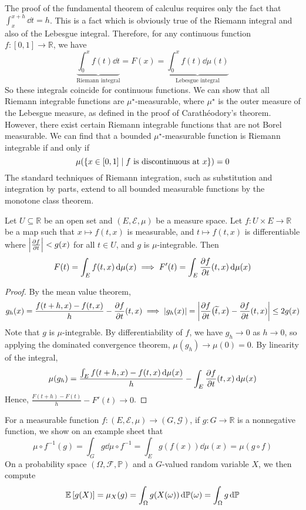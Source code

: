 \begin{remark}
	The proof of the fundamental theorem of calculus requires only the fact that \( \int_x^{x + h} \dd{t} = h \).
	This is a fact which is obviously true of the Riemann integral and also of the Lebesgue integral.
	Therefore, for any continuous function \( f \colon [0,1] \to \mathbb R \), we have
	\[ \underbrace{\int_0^x f(t) \dd{t}}_{\text{Riemann integral}} = F(x) = \underbrace{\int_0^x f(t) \dd{\mu(t)}}_{\text{Lebesgue integral}} \]
	So these integrals coincide for continuous functions.
	We can show that all Riemann integrable functions are \( \mu^\star \)-measurable, where \( \mu^\star \) is the outer measure of the Lebesgue measure, as defined in the proof of Carath\'eodory's theorem.
	However, there exist certain Riemann integrable functions that are not Borel measurable.
	We can find that a bounded \( \mu^\star \)-measurable function is Riemann integrable if and only if
	\[ \mu\qty(\qty{x \in [0,1] \mid f \text{ is discontinuous at } x}) = 0 \]
	The standard techniques of Riemann integration, such as substitution and integration by parts, extend to all bounded measurable functions by the monotone class theorem.
\end{remark}
\begin{theorem}
	Let \( U \subseteq \mathbb R \) be an open set and \( (E, \mathcal E, \mu) \) be a measure space.
	Let \( f \colon U \times E \to \mathbb R \) be a map such that \( x \mapsto f(t, x) \) is measurable, and \( t \mapsto f(t,x) \) is differentiable where \( \abs{\pdv{f}{t}} < g(x) \) for all \( t \in U \), and \( g \) is \( \mu \)-integrable.
	Then
	\[ F(t) = \int_E f(t,x) \dd{\mu(x)} \implies F'(t) = \int_E \pdv{f}{t}\qty(t,x) \dd{\mu(x)} \]
\end{theorem}
\begin{proof}
	By the mean value theorem,
	\[ g_h(x) = \frac{f(t + h, x) - f(t, x)}{h} - \pdv{f}{t}\qty(t,x) \implies \abs{g_h(x)} = \abs{\pdv{f}{t}\qty(\widetilde t, x) - \pdv{f}{t}\qty(t, x)} \leq 2g(x) \]
	Note that \( g \) is \( \mu \)-integrable.
	By differentiability of \( f \), we have \( g_h \to 0 \) as \( h \to 0 \), so applying the dominated convergence theorem, \( \mu(g_h) \to \mu(0) = 0 \).
	By linearity of the integral,
	\[ \mu(g_h) = \frac{\int_E f(t + h, x) - f(t, x) \dd{\mu(x)}}{h} - \int_E \pdv{f}{t}\qty(t,x) \dd{\mu(x)} \]
	Hence, \( \frac{F(t+h) - F(t)}{h} - F'(t) \to 0 \).
\end{proof}
\begin{example}
	For a measurable function \( f \colon (E, \mathcal E, \mu) \to (G, \mathcal G) \), if \( g \colon G \to \mathbb R \) is a nonnegative function, we show on an example sheet that
	\[ \mu \circ f^{-1}(g) = \int_G g \dd{\mu\circ f^{-1}} = \int_E g(f(x)) \dd{\mu(x)} = \mu(g \circ f) \]
	On a probability space \( (\Omega, \mathcal F, \mathbb P) \) and a \( G \)-valued random variable \( X \), we then compute
	\[ \mathbb{E}\left[{g(X)}\right] = \mu_X(g) = \int_\Omega g(X(\omega)) \dd{\mathbb P(\omega)} = \int_\Omega g \dd{\mathbb {P}} \]
\end{example}
